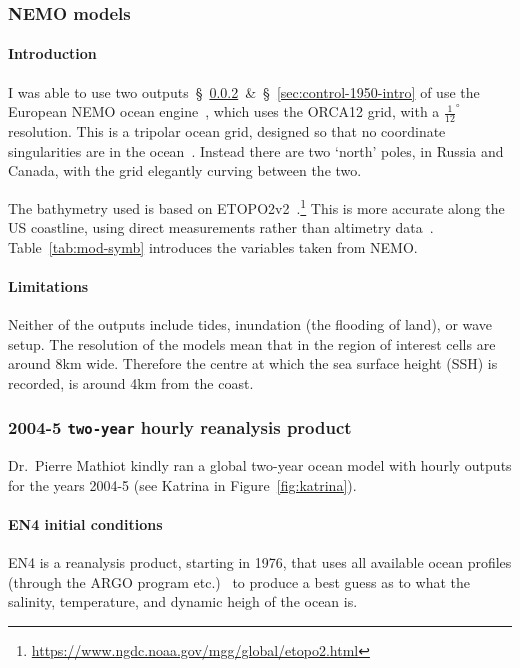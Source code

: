 \subsubsection{NEMO models}
\paragraph{Introduction}
\label{sec:nemo}
I was able to use two outputs~§~\ref{sec:rean-prod}~\&~§~\ref{sec:control-1950-intro}
of use the European NEMO ocean engine~\cite{madec2015nemo}, which uses the ORCA12 grid, with a  $\frac{1}{12}^{\circ}$
resolution.
This is a tripolar ocean grid, designed so that no coordinate singularities are in the ocean~\cite{madec1996global}.
Instead there are two `north' poles, in Russia and Canada,
with the grid elegantly curving between the two.

 The bathymetry used is based on
 ETOPO2v2~\cite{lecointre2011definition, noaa20062}.\footnote{\url{https://www.ngdc.noaa.gov/mgg/global/etopo2.html}}
 This is more accurate along the US coastline, using
 direct measurements rather than altimetry data~\cite{noaa20062}.
 Table~\ref{tab:mod-symb} introduces the variables taken from NEMO.



\paragraph{Limitations}

Neither of the outputs
include tides, inundation (the flooding of land), or wave setup.
The resolution of the models mean that in the region of interest cells are around
8km wide. Therefore the centre at which the sea surface height (SSH) is recorded,
is around 4km from the coast.

\subsubsection{2004-5 \texttt{two-year} hourly reanalysis product}
\label{sec:rean-prod}
Dr.~Pierre Mathiot kindly ran a global two-year ocean model with
hourly outputs for the years 2004-5 (see Katrina
in Figure~\ref{fig:katrina}).

\paragraph{EN4 initial conditions}
EN4 is a reanalysis product, starting in 1976, that uses all available ocean profiles
(through the ARGO program etc.)~\cite{good2013en4, HadObs}
to produce a best guess as to what the salinity, temperature,
and dynamic heigh of the ocean is.



